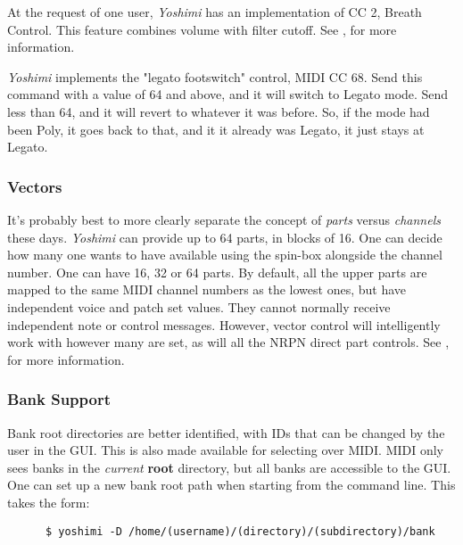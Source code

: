 \documentclass[
 11pt,
 twoside,
 a4paper,
 final                                 %
]{article}
\begin{document}
   At the request of one user, \textsl{Yoshimi} has an implementation of CC 2,
   Breath Control. This feature combines volume with filter cutoff.
   See , for more information.

   \textsl{Yoshimi} implements the "legato footswitch" control,
   MIDI CC 68.
   Send this command with a value of 64 and above, and it will
   switch to Legato mode. Send less than 64, and it will revert to whatever it
   was before.  So, if the mode had been Poly, it goes back to that, and it it
   already was Legato, it just stays at Legato.

\subsubsection{Vectors}
\label{subsubsec:new_features_vectors}

   It's probably best to more clearly separate the concept of
   \textsl{parts} versus \textsl{channels} these days.
   \textsl{Yoshimi} can provide up to 64 parts, in blocks of 16. One can
   decide how many one wants to have available using the spin-box alongside
   the channel number.  One can have 16, 32 or 64 parts.  By default, all the
   upper parts are mapped to the same MIDI channel numbers as the lowest ones,
   but have independent voice and patch set values. They cannot normally
   receive independent note or control messages. However, vector control will
   intelligently work with however many are set, as will all the NRPN direct
   part controls.
   See , for more information.

\subsubsection{Bank Support}
\label{subsubsec:new_features_bank_support}

   Bank root directories are better identified, with IDs that can be changed by
   the user in the GUI. This is also made available for selecting over MIDI.
   MIDI only sees banks in the \textsl{current}
   \textbf{root} directory, but all banks are accessible to the GUI.
   One can set up a new bank root path when starting from the
   command line. This takes the form:

   \begin{verbatim}
      $ yoshimi -D /home/(username)/(directory)/(subdirectory)/bank
   \end{verbatim}
\end{document}
